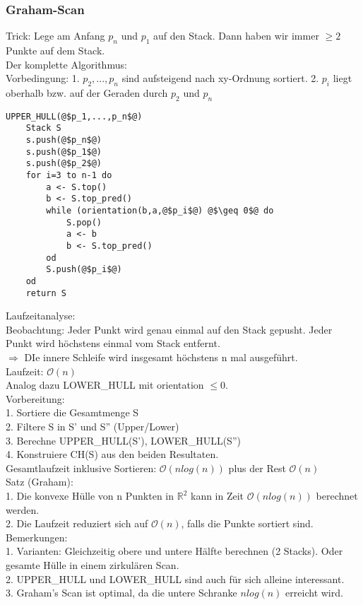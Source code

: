 \documentclass[a4paper]{article}
\newcommand{\oh}[1]{$\mathcal{O}(#1)$}
\begin{document}
\subsubsection{Graham-Scan}
Trick: Lege am Anfang $p_n$ und $p_1$ auf den Stack. Dann haben wir immer $\geq 2$ Punkte auf dem Stack.\\
Der komplette Algorithmus:\\
Vorbedingung: 1. $p_2,...,p_n$ sind aufsteigend nach xy-Ordnung sortiert. 2. $p_i$ liegt oberhalb bzw. auf der Geraden durch $p_2$ und $p_n$
\begin{lstlisting}[escapechar=@]
UPPER_HULL(@$p_1,...,p_n$@)
	Stack S
	s.push(@$p_n$@)
	s.push(@$p_1$@)
	s.push(@$p_2$@)
	for i=3 to n-1 do
		a <- S.top()
		b <- S.top_pred() 
		while (orientation(b,a,@$p_i$@) @$\geq 0$@ do
			S.pop()
			a <- b
			b <- S.top_pred()
		od
		S.push(@$p_i$@)
	od
	return S
\end{lstlisting}
Laufzeitanalyse:\\
Beobachtung: Jeder Punkt wird genau einmal auf den Stack gepusht. Jeder Punkt wird höchstens einmal vom Stack entfernt.\\
$\Rightarrow$ DIe innere Schleife wird insgesamt höchstens n mal ausgeführt. \\
Laufzeit: \oh{n}\\
Analog dazu LOWER\_HULL mit orientation $\leq 0$.\\
Vorbereitung: \\
1. Sortiere die Gesamtmenge S \\
2. Filtere S in S' und S'' (Upper/Lower) \\
3. Berechne UPPER\_HULL(S'), LOWER\_HULL(S'')\\
4. Konstruiere CH(S) aus den beiden Resultaten.\\
Gesamtlaufzeit inklusive Sortieren: \oh{nlog(n)} plus der Rest \oh{n}\\
Satz (Graham):\\
1. Die konvexe Hülle von n Punkten in $\mathbb{R}^2$ kann in Zeit \oh{nlog(n)} berechnet werden.\\
2. Die Laufzeit reduziert sich auf \oh{n}, falls die Punkte sortiert sind.\\
Bemerkungen:\\
1. Varianten: Gleichzeitig obere und untere Hälfte berechnen (2 Stacks). Oder gesamte Hülle in einem zirkulären Scan.\\
2. UPPER\_HULL und LOWER\_HULL sind auch für sich alleine interessant.\\
3. Graham's Scan ist optimal, da die untere Schranke $nlog(n)$ erreicht wird.\\
\end{document}
